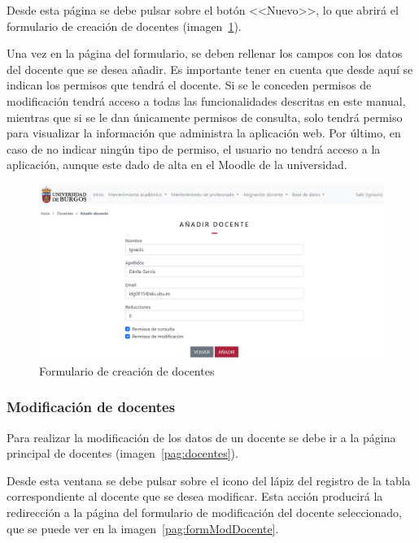 Desde esta página se debe pulsar sobre el botón <<Nuevo>>, lo que abrirá el formulario de creación de docentes (imagen~\ref{pag:formDocente}).

Una vez en la página del formulario, se deben rellenar los campos con los datos del docente que se desea añadir.
Es importante tener en cuenta que desde aquí se indican los permisos que tendrá el docente.
Si se le conceden permisos de modificación tendrá acceso a todas las funcionalidades descritas en este manual, mientras que si se le dan únicamente permisos de consulta, solo tendrá permiso para visualizar la información que administra la aplicación web.
Por último, en caso de no indicar ningún tipo de permiso, el usuario no tendrá acceso a la aplicación, aunque este dado de alta en el Moodle de la universidad.

\begin{figure}
	\centering
	\includegraphics[width=\textwidth]{../img/Anexos/Manual usuario/formDocente.png}
	\caption{Formulario de creación de docentes}\label{pag:formDocente}
\end{figure}

\subsubsection{Modificación de docentes}
Para realizar la modificación de los datos de un docente se debe ir a la página principal de docentes (imagen~\ref{pag:docentes}).

Desde esta ventana se debe pulsar sobre el icono del lápiz del registro de la tabla correspondiente al docente que se desea modificar.
Esta acción producirá la redirección a la página del formulario de modificación del docente seleccionado, que se puede ver en la imagen~\ref{pag:formModDocente}.

